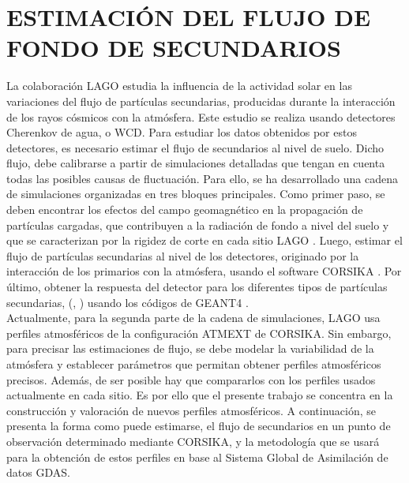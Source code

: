 \newpage
\newpage


\chapter{ESTIMACIÓN DEL FLUJO DE FONDO DE SECUNDARIOS}

La colaboración LAGO estudia la influencia de la actividad solar en las variaciones del flujo de partículas secundarias, producidas durante la interacción de los rayos cósmicos con la atmósfera. Este estudio se realiza usando detectores Cherenkov de agua, o WCD. Para estudiar los datos obtenidos por estos detectores, es necesario estimar el flujo de secundarios al nivel de suelo. Dicho flujo, debe calibrarse a partir de simulaciones detalladas que tengan en cuenta todas las posibles causas de fluctuación. Para ello, se ha desarrollado una cadena de simulaciones organizadas en tres bloques principales. Como primer paso, se deben  encontrar los efectos del campo geomagnético en la propagación de partículas cargadas, que contribuyen a la radiación de fondo a nivel del suelo y que se caracterizan por la rigidez de corte en cada sitio LAGO \cite{lagoSW}. Luego, estimar el flujo de partículas secundarias al nivel de los detectores, originado por la interacción de los primarios con la atmósfera\cite{Model}, usando el software CORSIKA \cite{Heck1998}. Por último, obtener la respuesta del detector para los diferentes tipos de  partículas secundarias, (\cite{andrei}, \cite{MuTe}) usando los códigos de GEANT4 \cite{GEANT4}.\\

Actualmente, para la segunda parte de la cadena de simulaciones, LAGO usa perfiles atmosféricos de la configuración ATMEXT de CORSIKA. Sin embargo, para precisar las estimaciones de flujo, se debe modelar la variabilidad de la atmósfera y establecer parámetros que permitan obtener perfiles atmosféricos precisos. Además, de ser posible hay que compararlos con los perfiles usados actualmente en cada sitio. Es por ello que el presente trabajo se concentra en la construcción y valoración de nuevos perfiles atmosféricos. A continuación, se presenta la forma como puede estimarse, el flujo de secundarios en un punto de observación determinado mediante CORSIKA, y la metodología que se usará para la obtención de estos perfiles en base al Sistema Global de Asimilación de datos GDAS.\\


